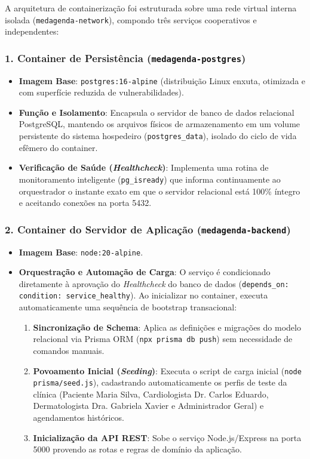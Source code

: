 A arquitetura de containerização foi estruturada sobre uma rede virtual interna isolada (\texttt{medagenda-network}), compondo três serviços cooperativos e independentes:

\subsubsection{1. Container de Persistência (\texttt{medagenda-postgres})}
\begin{itemize}
    \item \textbf{Imagem Base}: \texttt{postgres:16-alpine} (distribuição Linux enxuta, otimizada e com superfície reduzida de vulnerabilidades).
    \item \textbf{Função e Isolamento}: Encapsula o servidor de banco de dados relacional PostgreSQL, mantendo os arquivos físicos de armazenamento em um volume persistente do sistema hospedeiro (\texttt{postgres\_data}), isolado do ciclo de vida efêmero do container.
    \item \textbf{Verificação de Saúde (\textit{Healthcheck})}: Implementa uma rotina de monitoramento inteligente (\texttt{pg\_isready}) que informa continuamente ao orquestrador o instante exato em que o servidor relacional está 100\% íntegro e aceitando conexões na porta 5432.
\end{itemize}

\subsubsection{2. Container do Servidor de Aplicação (\texttt{medagenda-backend})}
\begin{itemize}
    \item \textbf{Imagem Base}: \texttt{node:20-alpine}.
    \item \textbf{Orquestração e Automação de Carga}: O serviço é condicionado diretamente à aprovação do \textit{Healthcheck} do banco de dados (\texttt{depends\_on: condition: service\_healthy}). Ao inicializar no container, executa automaticamente uma sequência de bootstrap transacional:
    \begin{enumerate}
        \item \textbf{Sincronização de Schema}: Aplica as definições e migrações do modelo relacional via Prisma ORM (\texttt{npx prisma db push}) sem necessidade de comandos manuais.
        \item \textbf{Povoamento Inicial (\textit{Seeding})}: Executa o script de carga inicial (\texttt{node prisma/seed.js}), cadastrando automaticamente os perfis de teste da clínica (Paciente Maria Silva, Cardiologista Dr. Carlos Eduardo, Dermatologista Dra. Gabriela Xavier e Administrador Geral) e agendamentos históricos.
        \item \textbf{Inicialização da API REST}: Sobe o serviço Node.js/Express na porta 5000 provendo as rotas e regras de domínio da aplicação.
    \end{enumerate}
\end{itemize}

